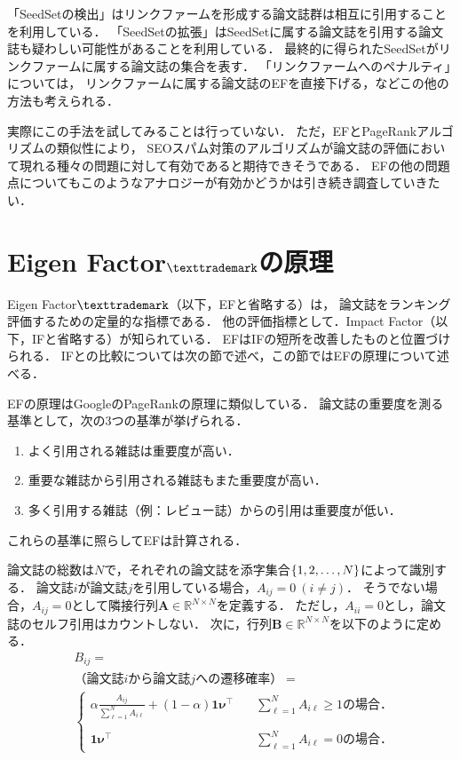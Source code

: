 「SeedSetの検出」はリンクファームを形成する論文誌群は相互に引用することを利用している．
「SeedSetの拡張」はSeedSetに属する論文誌を引用する論文誌も疑わしい可能性があることを利用している．
最終的に得られたSeedSetがリンクファームに属する論文誌の集合を表す．
「リンクファームへのペナルティ」については，
リンクファームに属する論文誌のEFを直接下げる，などこの他の方法も考えられる．
\par
実際にこの手法を試してみることは行っていない．
ただ，EFとPageRankアルゴリズムの類似性により，
SEOスパム対策のアルゴリズムが論文誌の評価において現れる種々の問題に対して有効であると期待できそうである．
EFの他の問題点についてもこのようなアナロジーが有効かどうかは引き続き調査していきたい．


\section{Eigen Factor$\texttrademark$の原理}
Eigen Factor$\texttrademark$（以下，EFと省略する）は，
論文誌をランキング評価するための定量的な指標である．
他の評価指標として．Impact Factor（以下，IFと省略する）が知られている．
EFはIFの短所を改善したものと位置づけられる．
IFとの比較については次の節で述べ，この節ではEFの原理について述べる．
\par
EFの原理はGoogleのPageRankの原理に類似している．
論文誌の重要度を測る基準として，次の3つの基準が挙げられる．
\begin{enumerate}
    \item よく引用される雑誌は重要度が高い．
    \item 重要な雑誌から引用される雑誌もまた重要度が高い．
    \item 多く引用する雑誌（例：レビュー誌）からの引用は重要度が低い．
\end{enumerate}
これらの基準に照らしてEFは計算される．
\par
論文誌の総数は$N$で，それぞれの論文誌を添字集合$\lbrace 1,2,\ldots,N \rbrace$によって識別する．
論文誌$i$が論文誌$j$を引用している場合，$A_{ij}=0~(i\neq j)$．
そうでない場合，$A_{ij}=0$として隣接行列$\bm{A} \in \mathbb{R}^{N \times N}$を定義する．
ただし，$A_{ii}=0$とし，論文誌のセルフ引用はカウントしない．
次に，行列$\bm{B} \in \mathbb{R}^{N \times N}$を以下のように定める．
\begin{align*}
    & B_{ij} = \\
    & \text{（論文誌$i$から論文誌$j$への遷移確率）} = \\
    & \begin{cases}
        \alpha \frac{A_{ij}}{\sum_{\ell=1}^N A_{i\ell}} + (1-\alpha) \bm{1}\bm{\nu}^{\top}
        &\quad \sum_{\ell=1}^N A_{i\ell} \geq 1\text{の場合．} \\
        \\
        \bm{1}\bm{\nu}^{\top}
        &\quad \sum_{\ell=1}^N A_{i\ell} =0\text{の場合．} 
    \end{cases}
\end{align*}
